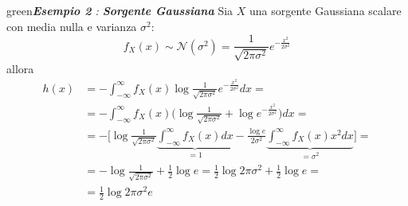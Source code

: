 \begin{mybox}[breakable]{green}{\textit{\textbf{Esempio 2} : \textbf{Sorgente Gaussiana }}}
Sia $X$ una sorgente Gaussiana scalare con media nulla e varianza $\sigma^2$:
\begin{equation*}
    f_X(x) \sim \mathcal{N}(\sigma^2) =  \frac{1}{\sqrt{2 \pi \sigma^2}} e^{-\frac{x^2}{2\sigma^2}}
\end{equation*}
allora
\begin{align*}
    h(x) &= -\int_{-\infty}^{\infty} f_X(x) \log \frac{1}{\sqrt{2 \pi \sigma^2}} e^{-\frac{x^2}{2\sigma^2}}dx = \\
    &= -\int_{-\infty}^{\infty} f_X(x) \Big ( \log \frac{1}{\sqrt{2 \pi \sigma^2}} + \log e^{-\frac{x^2}{2\sigma^2}} \Big )dx = \\
    &= - \Big [ \log \frac{1}{\sqrt{2 \pi \sigma^2}} \underbrace{\int_{-\infty}^{\infty}f_X(x) dx}_{= 1}  - \frac{\log e}{2\sigma^2} \underbrace{\int_{-\infty}^{\infty} f_X(x) x^ 2 dx}_{= \sigma^2} \Big ] = \\
    &= - \log \frac{1}{\sqrt{2 \pi \sigma^2}} + \frac{1}{2} \log e = \frac{1}{2} \log 2 \pi \sigma^2 + \frac{1}{2} \log e = \\
    &= \frac{1}{2} \log 2\pi \sigma^2 e
\end{align*}
\end{mybox}

